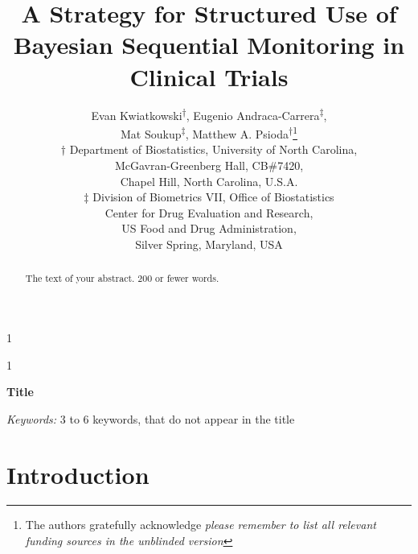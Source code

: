 \documentclass[12pt]{article}
\newcommand{\blind}{1}
\begin{document}
\def\spacingset#1{\renewcommand{\baselinestretch}%
{#1}\small\normalsize} \spacingset{1}



\blind
{
  \title{\bf A Strategy for Structured Use of Bayesian Sequential Monitoring in Clinical Trials}
  \author{Evan Kwiatkowski\textsuperscript{$\dagger$}, 
	        Eugenio Andraca-Carrera\textsuperscript{$\ddagger$},\\
					Mat Soukup\textsuperscript{$\ddagger$},
					\medskip Matthew A. Psioda\textsuperscript{$\dagger$}\thanks{The authors gratefully acknowledge \textit{please remember to list all relevant funding sources in the unblinded version}}\\
	  $\dagger$ Department of Biostatistics,
		University of North Carolina, \\
		McGavran-Greenberg Hall, CB\#7420, \\
		\medskip Chapel Hill, North Carolina, U.S.A.\\
    $\ddagger$ Division of Biometrics VII, Office of Biostatistics \\
		           Center for Drug Evaluation and Research, \\
							 US Food and Drug Administration, \\
							 Silver Spring, Maryland, USA \\									
		}
  \maketitle
} \fi

\blind
{
  \bigskip
  \bigskip
  \bigskip
  \begin{center}
    {\LARGE\bf Title}
\end{center}
  \medskip
} \fi

\bigskip
\begin{abstract}
The text of your abstract. 200 or fewer words.
\end{abstract}

\noindent%
{\it Keywords:}  3 to 6 keywords, that do not appear in the title
\vfill

\newpage
\spacingset{1.5} %

\section{Introduction}
\end{document}
